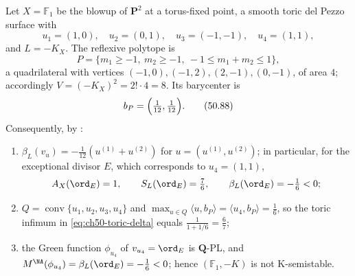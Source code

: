 \par\noindent\begin{minipage}{\textwidth}
\begin{example}[$\mathbb F_1=\mathrm{Bl}_{p}\mathbf P^2$ is not
K-semistable, and $\delta=6/7$]
\label{ex:ch50-toric-F1}
Let $X=\mathbb F_1$ be the blowup of $\mathbf P^2$ at a torus-fixed
point, a smooth toric del Pezzo surface with
\[
 u_1=(1,0),\quad u_2=(0,1),\quad u_3=(-1,-1),\quad u_4=(1,1),
\]
and $L=-K_X$.  The reflexive polytope is
\[
 P=\{m_1\ge-1,\ m_2\ge-1,\ -1\le m_1+m_2\le1\},
\]
a quadrilateral with vertices $(-1,0),(-1,2),(2,-1),(0,-1)$, of area
$4$; accordingly $V=(-K_X)^2=2!\cdot4=8$.  Its barycenter is
\[
 b_P=\Bigl(\tfrac1{12},\tfrac1{12}\Bigr).
\tag{50.88}\label{eq:ch50-F1-barycenter}
\]
Consequently, by :
\begin{enumerate}
\item\label{itm:ch50-F1:beta}
      $\beta_L(v_u)=-\tfrac1{12}(u^{(1)}+u^{(2)})$ for
      $u=(u^{(1)},u^{(2)})$; in particular, for the exceptional divisor
      $E$, which corresponds to $u_4=(1,1)$,
      \[
       A_X(\ord_E)=1,\qquad S_L(\ord_E)=\tfrac76,\qquad
       \beta_L(\ord_E)=-\tfrac16<0 ;
      \]
\item\label{itm:ch50-F1:delta}
      $Q=\operatorname{conv}\{u_1,u_2,u_3,u_4\}$ and
      $\max_{u\in Q}\langle u,b_P\rangle=\langle u_4,b_P\rangle=\tfrac16$,
      so the toric infimum in \eqref{eq:ch50-toric-delta} equals
      $\tfrac{1}{1+1/6}=\tfrac67$;
\item\label{itm:ch50-F1:destab}
      the Green function $\phi_{u_4}$ of $v_{u_4}=\ord_E$ is
      $\mathbf Q$-PL, and
      $M^{\NA}(\phi_{u_4})=\beta_L(\ord_E)=-\tfrac16<0$; hence
      $(\mathbb F_1,-K)$ is not K-semistable.
\end{enumerate}
\end{example}
\end{minipage}\par\medskip

